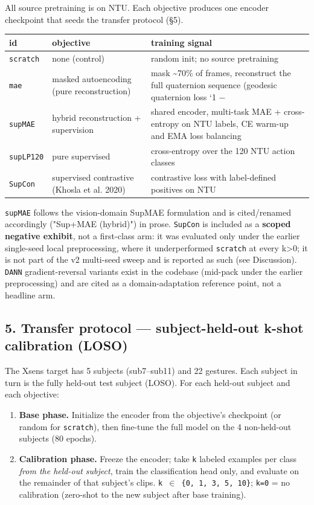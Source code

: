 All source pretraining is on NTU. Each objective produces one encoder checkpoint that seeds the transfer protocol (\S{}5).

\begin{center}
\small
\begin{tabular}{lll}
\toprule
id & objective & training signal \\
\midrule
\texttt{scratch} & none (control) & random init; no source pretraining \\
\texttt{mae} & masked autoencoding (pure reconstruction) & mask \textasciitilde{}70\% of frames, reconstruct the full quaternion sequence (geodesic quaternion loss `1 $-$ \\
\texttt{supMAE} & hybrid reconstruction + supervision & shared encoder, multi-task MAE + cross-entropy on NTU labels, CE warm-up and EMA loss balancing \\
\texttt{supLP120} & pure supervised & cross-entropy over the 120 NTU action classes \\
\texttt{SupCon} & supervised contrastive (Khosla et al. 2020) & contrastive loss with label-defined positives on NTU \\
\bottomrule
\end{tabular}
\end{center}

\texttt{supMAE} follows the vision-domain SupMAE formulation and is cited/renamed accordingly ("Sup+MAE (hybrid)") in prose. \texttt{SupCon} is included as a \textbf{scoped negative exhibit}, not a first-class arm: it was evaluated only under the earlier single-seed local preprocessing, where it underperformed \texttt{scratch} at every k>0; it is not part of the v2 multi-seed sweep and is reported as such (see Discussion). \texttt{DANN} gradient-reversal variants exist in the codebase (mid-pack under the earlier preprocessing) and are cited as a domain-adaptation reference point, not a headline arm.

\subsection{5. Transfer protocol --- subject-held-out k-shot calibration (LOSO)}

The Xsens target has 5 subjects (sub7--sub11) and 22 gestures. Each subject in turn is the fully held-out test subject (LOSO). For each held-out subject and each objective:

\begin{enumerate}
  \item \textbf{Base phase.} Initialize the encoder from the objective's checkpoint (or random for \texttt{scratch}), then fine-tune the full model on the 4 non-held-out subjects (80 epochs).
  \item \textbf{Calibration phase.} Freeze the encoder; take \texttt{k} labeled examples per class \textit{from the held-out subject}, train the classification head only, and evaluate on the remainder of that subject's clips. \texttt{k $\in$ \{0, 1, 3, 5, 10\}}; \texttt{k=0} = no calibration (zero-shot to the new subject after base training).
\end{enumerate}

